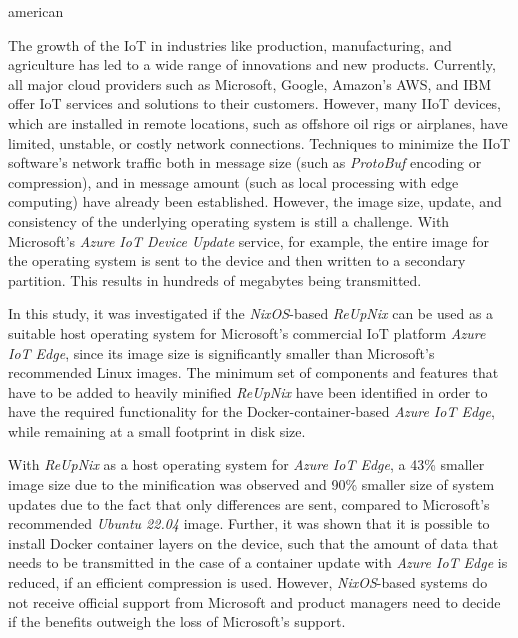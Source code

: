 \begin{otherlanguage*}{american}

The growth of the \ac{IoT} in industries like production, manufacturing, and
agriculture has led to a wide range of innovations and new products. Currently,
all major cloud providers such as Microsoft, Google, Amazon's AWS, and IBM offer
\ac{IoT} services and solutions to their customers. However, many \ac{IIoT} devices,
which are installed in remote locations, such as offshore oil rigs or airplanes,
have limited, unstable, or costly network connections. Techniques to
minimize the \ac{IIoT} software's network traffic both in message size
(such as \textit{ProtoBuf} encoding or compression), and in message amount
(such as local processing with edge computing) have already been established.
However, the image size, update, and consistency of the underlying operating
system is still a challenge. With Microsoft's \textit{Azure IoT Device
Update} service, for example, the entire image for the operating system is sent
to the device and then written to a secondary partition. This results in hundreds
of megabytes being transmitted.

In this study, it was investigated if the \textit{NixOS}-based \textit{ReUpNix}
can be used as a suitable host operating system for Microsoft's commercial
\ac{IoT} platform \textit{Azure IoT Edge}, since its image size is significantly
smaller than Microsoft's recommended Linux images.
The  minimum set of components and features that have to be added to heavily
minified \textit{ReUpNix} have been identified in order to have the required
functionality for the
Docker-container-based \textit{Azure IoT Edge}, while remaining at a small
footprint in disk size.

With \textit{ReUpNix} as a host operating system for \textit{Azure IoT Edge}, a
43\% smaller image size due to the minification was observed and 90\% smaller size of
system updates due to the fact that only differences are sent, compared to
Microsoft's recommended \textit{Ubuntu 22.04} image.
Further, it was shown that it is possible to install Docker container
layers on the device, such that the amount of data that needs to be transmitted
in the case of a container update with \textit{Azure IoT Edge} is reduced, if
an efficient compression is used.
However, \textit{NixOS}-based systems do not receive official support from
Microsoft and product managers need to decide if the benefits outweigh the loss
of Microsoft's support.

\end{otherlanguage*}



